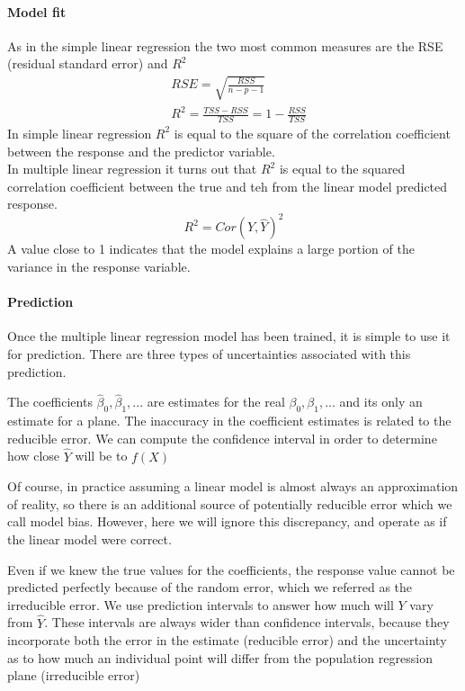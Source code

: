 \documentclass[../document.tex]{subfiles}
\begin{document}
	\paragraph{Model fit}
	As in the simple linear regression the two most common measures are the RSE (residual standard error) and \(R^2\)
	\begin{equation}
	\begin{split}
		&RSE = \sqrt{\frac{RSS}{n-p-1}}\\
		&R^2 = \frac{TSS-RSS}{TSS}=1-\frac{RSS}{TSS}
	\end{split}
	\end{equation}
	In simple linear regression \(R^2\) is equal to the square of the correlation coefficient between the response and the predictor variable.\\
	In multiple linear regression it turns out that \(R^2\) is equal to the squared correlation coefficient between the true and teh from the linear model predicted response.
	\begin{equation}
		R^2=Cor(Y,\hat{Y})^2
	\end{equation}
	A value close to 1 indicates that the model explains a large portion of the variance in the response variable.
	\paragraph{Prediction}
	Once the multiple linear regression model has been trained, it is simple to use it for prediction. There are three types of uncertainties associated with this prediction.
	\begin{description}
		\item The coefficients \(\hat{\beta}_{0},\hat{\beta}_{1},...\) are estimates for the real \(\beta_{0},\beta_{1},...\) and its only an estimate for a plane. The inaccuracy in the coefficient estimates is related to the reducible error. We can compute the confidence interval in order to determine how close \(\hat{Y}\) will be to \(f(X)\)
		\item Of course, in practice assuming a linear model is almost always an approximation of reality, so there is an additional source of potentially reducible error which we call model bias. However, here we will ignore this discrepancy, and operate as if the linear model were correct.
		\item Even if we knew the true values for the coefficients, the response value cannot be predicted perfectly because of the random error, which we referred as the irreducible error. We use prediction intervals to answer how much will \(Y\) vary from \(\hat{Y}\). These intervals are always wider than confidence intervals, because they incorporate both the error in the estimate (reducible error) and the uncertainty as to how much an individual point will differ from the population regression plane (irreducible error)
	\end{description}
\end{document}
